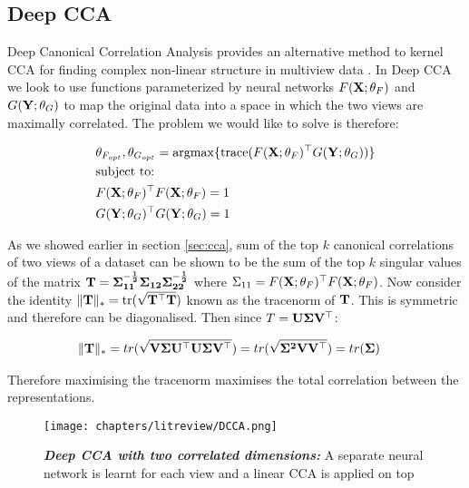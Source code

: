 \subsection{Deep CCA}

Deep Canonical Correlation Analysis provides an alternative method to kernel CCA for finding complex non-linear structure in multiview data \cite{andrew2013deep}. In Deep CCA we look to use functions parameterized by neural networks $F(\bold{X};\theta_F)$ and $G(\bold{Y};\theta_G)$ to map the original data into a space in which the two views are maximally correlated. The problem we would like to solve is therefore:

\begin{align}
    & \theta_{F_{opt}},\theta_{G_{opt}}=\mathrm{argmax}\{\text{trace}( F(\bold{X};\theta_F)^{\top}G(\bold{Y};\theta_G))  \}\\
    & \text{subject to:} \notag\\
    & F(\bold{X};\theta_F)^{\top}F(\bold{X};\theta_F)=1 \notag\\
    & G(\bold{Y};\theta_G)^{\top}G(\bold{Y};\theta_G)=1 \notag
\end{align}

As we showed earlier in section \ref{sec:cca}, sum of the top $k$ canonical correlations of two views of a dataset can be shown to be the sum of the top $k$ singular values of the matrix $\bold{T}=\bold{\Sigma_{11}^{-\frac{1}{2}}\Sigma_{12}\Sigma_{22}^{-\frac{1}{2}}}$ where $\Sigma_{11}=F(\bold{X};\theta_F)^{\top}F(\bold{X};\theta_F)$. Now consider the identity $\|\bold{T}\|_*=\text{tr}(\sqrt{\bold{T^{\top}T}})$ known as the tracenorm of $\bold{T}$. This is symmetric and therefore can be diagonalised. Then since $T=\bold{U\Sigma V^{\top}}$:

\begin{align}
    & \|\bold{T}\|_*=tr(\sqrt{\bold{V\Sigma U^{\top}U\Sigma V^{\top}}})=tr(\sqrt{\bold{\Sigma^2 VV^{\top}}})=tr(\bold{\Sigma})
\end{align}

Therefore maximising the tracenorm maximises the total correlation between the representations.

\begin{figure}[H] %
    \centering %
    \texttt{[image: chapters/litreview/DCCA.png]} 
    \caption[Deep CCA Representation]{\textit{\textbf{Deep CCA with two correlated dimensions:}} A separate neural network is learnt for each view and a linear CCA is applied on top \cite{andrew2013deep}}
    \label{img:DCCA}
\end{figure}

